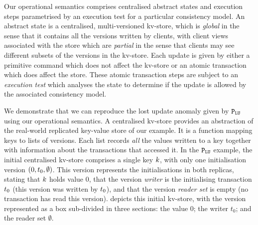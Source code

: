 





Our  operational semantics comprises centralised abstract states
 and
execution steps parametrised by an execution test for a particular
consistency model.
An abstract  state is a
centralised, multi-versioned kv-store, which is {\em global} in the
sense that it contains all the versions written by clients, with
client views associated with the  store 
which are {\em partial} in the sense that clients may see different 
subsets of the versions in the kv-store. Each update is given by either
a primitive command which does not affect the kv-store or an atomic
transaction which does affect the store. These atomic
transaction steps are subject to an {\em execution test} which
analyses the state to determine if the update is allowed by 
the associated consistency model. 


We demonstrate  that we can reproduce the lost update anomaly given by 
\(\mathtt{P}_{\mathtt{LU}}\) using our operational semantics.
A centralised kv-store provides   an   abstraction of  the real-world
replicated key-value store of our example. 
It is a  function mapping keys to lists of {versions}.
Each list  records {\em  all} the values written to a  key together with
information about the transactions that accessed  it. 
In the \(\mathtt{P}_{\mathtt{LU}}\) example, the initial centralised kv-store comprises a single key \(k\), with only one initialisation version \((0, t_{0}, \emptyset)\).
This version represents the initialisations in both replicas,
stating that \(k\) holds value \(0\), 
that the version \emph{writer} is the initialising transaction
\(t_0\) (this version was written by \(t_0\)), 
and that the version \emph{reader set} is empty (no transaction has read this version). 
 depicts this initial kv-store, with the version
represented as a box sub-divided in three sections: the value \(0\);
the writer \(t_0\); and the reader set \(\emptyset\). 


